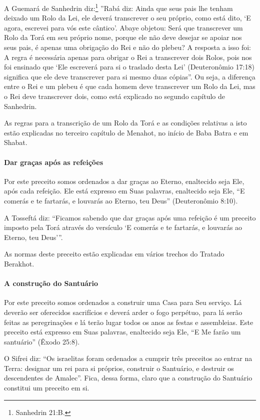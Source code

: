 A Guemará de Sanhedrin diz:\footnote{Sanhedrin 21:B.} ''Rabá diz: Ainda que
seus pais lhe tenham deixado um Rolo da Lei, ele deverá transcrever o seu próprio,
como está dito, `E agora, escrevei para vós este cântico'. Abaye
objetou: Será que transcrever um Rolo da Torá em seu próprio nome,
porque ele não deve desejar se apoiar nos seus pais, é apenas uma
obrigação do Rei e não do plebeu? A resposta a isso foi: A regra é
necessária apenas para obrigar o Rei a transcrever dois Rolos, pois nos
foi ensinado que `Ele escreverá para si o traslado desta Lei'
(Deuteronômio 17:18) significa que ele deve transcrever para si mesmo
duas cópias''. Ou seja, a diferença entre o Rei e um plebeu é que cada
homem deve transcrever um Rolo da Lei, mas o Rei deve transcrever dois,
como está explicado no segundo capítulo de Sanhedrin.

As regras para a transcrição de um Rolo da Torá e as condições
relativas a isto estão explicadas no terceiro capítulo de Menahot, no
início de Baba Batra e em Shabat.

\paragraph{Dar graças após as refeições}

Por este preceito somos ordenados a dar graças ao Eterno, enaltecido
seja Ele, após cada refeição. Ele está expresso em Suas palavras,
enaltecido seja Ele, ``E comerás e te fartarás, e louvarás ao Eterno,
teu Deus'' (Deuteronômio 8:10).

A Tosseftá diz: ``Ficamos sabendo que dar graças após uma refeição é um
preceito imposto pela Torá através do versículo `E comerás e te
fartarás, e louvarás ao Eterno, teu Deus'''.

As normas deste preceito estão explicadas em vários trechos do Tratado
Berakhot.

\paragraph{A construção do Santuário}

Por este preceito somos ordenados a construir uma Casa para Seu serviço.
Lá deverão ser oferecidos sacrifícios e deverá arder o fogo perpétuo,
para lá serão feitas as peregrinações e lá terão lugar todos os anos as
festas e assembleias. Este preceito está expresso em Suas palavras,
enaltecido seja Ele, ``E Me farão um santuário'' (Êxodo 25:8).

O Sifrei diz: ``Os israelitas foram ordenados a cumprir três preceitos
ao entrar na Terra: designar um rei para si próprios, construir o
Santuário, e destruir os descendentes de Amalec''. Fica, dessa forma,
claro que a construção do Santuário constitui um preceito em si.

